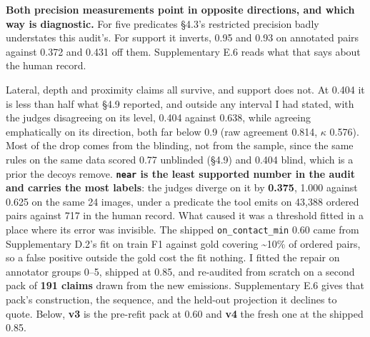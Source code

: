 \textbf{Both precision measurements point in opposite directions, and which way is diagnostic.} For five predicates \S{}4.3's restricted precision badly understates this audit's. For support it inverts, 0.95 and 0.93 on annotated pairs against 0.372 and 0.431 off them. Supplementary E.6 reads what that says about the human record.

Lateral, depth and proximity claims all survive, and support does not. At 0.404 it is less than half what \S{}4.9 reported, and outside any interval I had stated, with the judges disagreeing on its level, 0.404 against 0.638, while agreeing emphatically on its direction, both far below 0.9 (raw agreement 0.814, $\kappa$ 0.576). Most of the drop comes from the blinding, not from the sample, since the same rules on the same data scored 0.77 unblinded (\S{}4.9) and 0.404 blind, which is a prior the decoys remove. \textbf{\texttt{near} is the least supported number in the audit and carries the most labels}: the judges diverge on it by \textbf{0.375}, 1.000 against 0.625 on the same 24 images, under a predicate the tool emits on 43,388 ordered pairs against 717 in the human record. What caused it was a threshold fitted in a place where its error was invisible. The shipped \texttt{on\_\allowbreak{}contact\_\allowbreak{}min} 0.60 came from Supplementary D.2's fit on train F1 against gold covering \textasciitilde{}10\% of ordered pairs, so a false positive outside the gold cost the fit nothing. I fitted the repair on annotator groups 0--5, shipped at 0.85, and re-audited from scratch on a second pack of \textbf{191 claims} drawn from the new emissions. Supplementary E.6 gives that pack's construction, the sequence, and the held-out projection it declines to quote. Below, \textbf{v3} is the pre-refit pack at 0.60 and \textbf{v4} the fresh one at the shipped 0.85.

